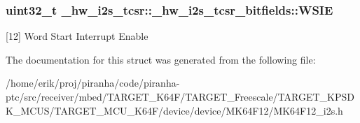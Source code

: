 \subsubsection[{\texorpdfstring{W\+S\+IE}{WSIE}}]{\setlength{\rightskip}{0pt plus 5cm}uint32\+\_\+t \+\_\+hw\+\_\+i2s\+\_\+tcsr\+::\+\_\+hw\+\_\+i2s\+\_\+tcsr\+\_\+bitfields\+::\+W\+S\+IE}\hypertarget{struct__hw__i2s__tcsr_1_1__hw__i2s__tcsr__bitfields_a281d5798d254b5524524832ee20dbd12}{}\label{struct__hw__i2s__tcsr_1_1__hw__i2s__tcsr__bitfields_a281d5798d254b5524524832ee20dbd12}
\mbox{[}12\mbox{]} Word Start Interrupt Enable 

The documentation for this struct was generated from the following file\+:\begin{DoxyCompactItemize}
\item 
/home/erik/proj/piranha/code/piranha-\/ptc/src/receiver/mbed/\+T\+A\+R\+G\+E\+T\+\_\+\+K64\+F/\+T\+A\+R\+G\+E\+T\+\_\+\+Freescale/\+T\+A\+R\+G\+E\+T\+\_\+\+K\+P\+S\+D\+K\+\_\+\+M\+C\+U\+S/\+T\+A\+R\+G\+E\+T\+\_\+\+M\+C\+U\+\_\+\+K64\+F/device/device/\+M\+K64\+F12/M\+K64\+F12\+\_\+i2s.\+h\end{DoxyCompactItemize}
